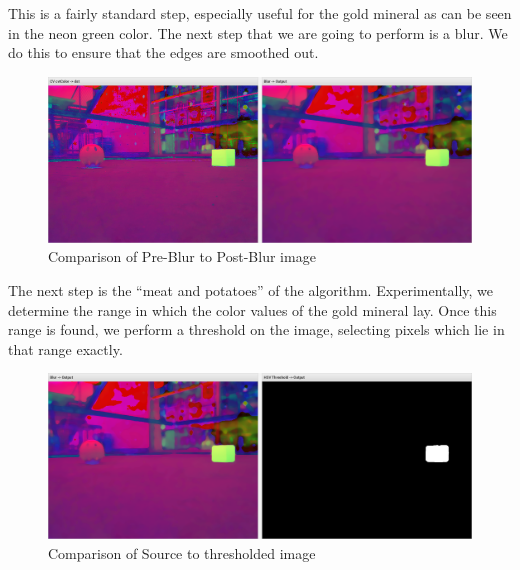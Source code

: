 \documentclass[../main.tex]{subfiles}
\begin{document}
This is a fairly standard step, especially useful for the gold mineral as can be seen in the neon green color. The next step that we are going to perform is a blur. We do this to ensure that the edges are smoothed out. 
\begin{figure}[H]
    \centering
    \includegraphics[width=400pt]{sections/vision/images/opencv/gold_pipeline_blur.png}
    \caption{Comparison of Pre-Blur to Post-Blur image}
\end{figure}

The next step is the ``meat and potatoes'' of the algorithm. Experimentally, we determine the range in which the color values of the gold mineral lay. Once this range is found, we perform a threshold on the image, selecting pixels which lie in that range exactly. 
\begin{figure}[H]
    \centering
    \includegraphics[width=400pt]{sections/vision/images/opencv/gold_pipeline_threshold.png}
    \caption{Comparison of Source to thresholded image}
\end{figure}
\end{document}
